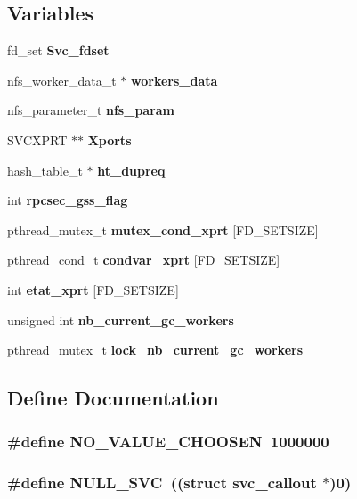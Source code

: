 \subsection*{Variables}
\begin{CompactItemize}
\item 
fd\_\-set {\bf Svc\_\-fdset}
\item 
nfs\_\-worker\_\-data\_\-t $\ast$ {\bf workers\_\-data}
\item 
nfs\_\-parameter\_\-t {\bf nfs\_\-param}
\item 
SVCXPRT $\ast$$\ast$ {\bf Xports}
\item 
hash\_\-table\_\-t $\ast$ {\bf ht\_\-dupreq}
\item 
int {\bf rpcsec\_\-gss\_\-flag}
\item 
pthread\_\-mutex\_\-t {\bf mutex\_\-cond\_\-xprt} [FD\_\-SETSIZE]
\item 
pthread\_\-cond\_\-t {\bf condvar\_\-xprt} [FD\_\-SETSIZE]
\item 
int {\bf etat\_\-xprt} [FD\_\-SETSIZE]
\item 
unsigned int {\bf nb\_\-current\_\-gc\_\-workers}
\item 
pthread\_\-mutex\_\-t {\bf lock\_\-nb\_\-current\_\-gc\_\-workers}
\end{CompactItemize}


\subsection{Define Documentation}
\subsubsection{\setlength{\rightskip}{0pt plus 5cm}\#define NO\_\-VALUE\_\-CHOOSEN\ 1000000}\label{nfs__rpc__dispatcher__thread_8c_a1}


\subsubsection{\setlength{\rightskip}{0pt plus 5cm}\#define NULL\_\-SVC\ ((struct svc\_\-callout $\ast$)0)}\label{nfs__rpc__dispatcher__thread_8c_a0}




